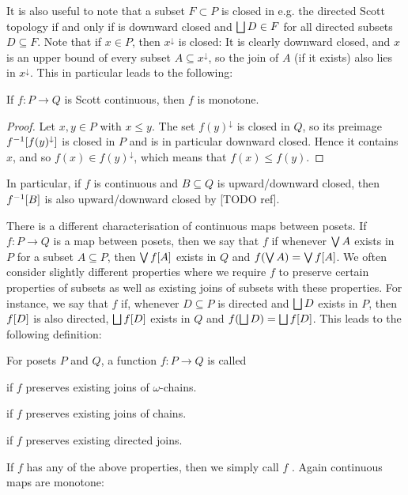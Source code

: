 \documentclass[a4paper, 11pt, article, danish, oneside]{memoir}
\DeclarePairedDelimiter{\auxdelimbracket}{[}{]}
\DeclareMathOperator*{\smallbigvee}{\textstyle\bigvee}
\DeclareMathOperator*{\bigjoin}{\mathchoice
    {\smallbigvee}%
    {\bigvee}%
    {\bigvee}%
    {\bigvee}%
}
\DeclareMathOperator*{\smallbigsqcup}{\textstyle\bigsqcup}
\DeclareMathOperator*{\bigdjoin}{\mathchoice
    {\smallbigsqcup}%
    {\bigsqcup}%
    {\bigsqcup}%
    {\bigsqcup}%
}
\newcommand{\preim}[2][]{^{-1}\auxdelimbracket[#1]{#2}}
\newcommand{\image}[2][]{\auxdelimbracket[#1]{#2}}
\begin{document}
It is also useful to note that a subset $F \subset P$ is closed in e.g. the directed Scott topology if and only if is downward closed and $\bigdjoin D \in F$ for all directed subsets $D \subseteq F$. Note that if $x \in P$, then $x^\downarrow$ is closed: It is clearly downward closed, and $x$ is an upper bound of every subset $A \subseteq x^\downarrow$, so the join of $A$ (if it exists) also lies in $x^\downarrow$. This in particular leads to the following:

\begin{lemma}
    If $f \colon P \to Q$ is Scott continuous, then $f$ is monotone.
\end{lemma}

\begin{proof}
    Let $x,y \in P$ with $x \leq y$. The set $f(y)^\downarrow$ is closed in $Q$, so its preimage $f\preim{f(y)^\downarrow}$ is closed in $P$ and is in particular downward closed. Hence it contains $x$, and so $f(x) \in f(y)^\downarrow$, which means that $f(x) \leq f(y)$.
\end{proof}
%
In particular, if $f$ is continuous and $B \subseteq Q$ is upward/downward closed, then $f\preim{B}$ is also upward/downward closed by [TODO ref].

There is a different characterisation of continuous maps between posets. If $f \colon P \to Q$ is a map between posets, then we say that $f$  if whenever $\bigjoin A$ exists in $P$ for a subset $A \subseteq P$, then $\bigjoin f\image{A}$ exists in $Q$ and $f(\bigjoin A) = \bigjoin f\image{A}$. We often consider slightly different properties where we require $f$ to preserve certain properties of subsets as well as existing joins of subsets with these properties. For instance, we say that $f$  if, whenever $D \subseteq P$ is directed and $\bigdjoin D$ exists in $P$, then $f\image{D}$ is also directed, $\bigdjoin f\image{D}$ exists in $Q$ and $f(\bigdjoin D) = \bigdjoin f\image{D}$. This leads to the following definition:

\begin{definition}
    For posets $P$ and $Q$, a function $f \colon P \to Q$ is called
    \begin{enumdef}
        \item {} if $f$ preserves existing joins of $\omega$-chains.
        
        \item {} if $f$ preserves existing joins of chains.
        
        \item {} if $f$ preserves existing directed joins.
    \end{enumdef}
\end{definition}
%
If $f$ has any of the above properties, then we simply call $f$ . Again continuous maps are monotone:
\end{document}
